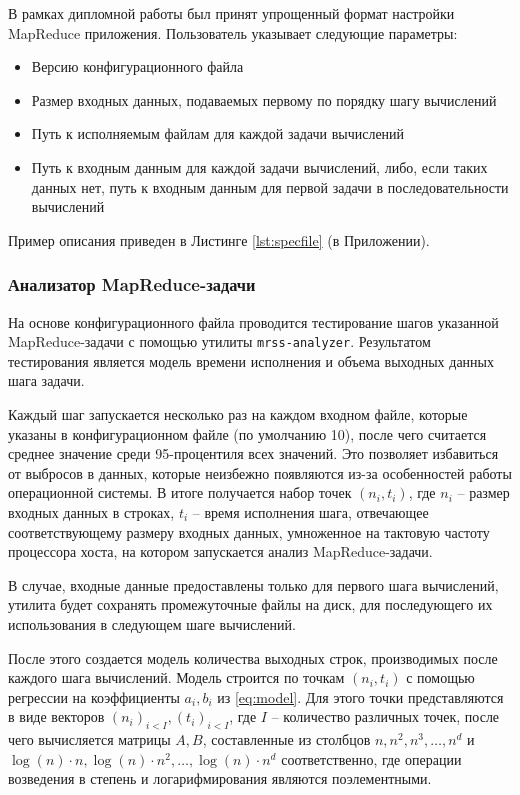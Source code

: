 \documentclass[../diploma.tex]{subfile}
\begin{document}
    В рамках дипломной работы был принят упрощенный формат настройки MapReduce
    приложения. Пользователь указывает следующие параметры:
    
    \begin{itemize}
        \item Версию конфигурационного файла
        \item Размер входных данных, подаваемых первому по порядку шагу вычислений
        \item Путь к исполняемым файлам для каждой задачи вычислений
        \item Путь к входным данным для каждой задачи вычислений, либо, если
              таких данных нет, путь к входным данным для первой задачи в
              последовательности вычислений
    \end{itemize}

    Пример описания приведен в Листинге \ref{lst:specfile} (в Приложении). 
    
    \subsubsection{Анализатор MapReduce-задачи}

    На основе конфигурационного файла проводится тестирование шагов указанной 
    MapReduce\hyp{}задачи с помощью утилиты {\tt mrss-analyzer}. Результатом тестирования является модель времени
    исполнения и объема выходных данных шага задачи.

    Каждый шаг запускается несколько раз на каждом входном файле, которые
    указаны в конфигурационном файле (по умолчанию 10), после чего считается
    среднее значение среди 95-процентиля всех значений. Это позволяет избавиться
    от выбросов в данных, которые неизбежно появляются из-за особенностей работы
    операционной системы. В итоге получается набор точек $(n_i, t_i)$, где $n_i$
    -- размер входных данных в строках, $t_i$ -- время исполнения шага,
    отвечающее соответствующему размеру входных данных, умноженное на тактовую 
    частоту процессора хоста, на котором запускается анализ MapReduce-задачи.

    В случае, входные данные предоставлены только для первого шага вычислений,
    утилита будет сохранять промежуточные файлы на диск, для последующего их
    использования в следующем шаге вычислений.
    
    После этого создается модель количества выходных строк, производимых после
    каждого шага вычислений. Модель строится по точкам $(n_i, t_i)$ с помощью
    регрессии на коэффициенты $a_i, b_i$ из \ref{eq:model}. Для этого точки
    представляются в виде векторов $(n_i)_{i < I}, (t_i)_{i < I}$, где $I$ --
    количество различных точек, после чего вычисляется матрицы $A, B$, составленные из
    столбцов $n, n^2, n^3, \ldots, n^d$ и $\log(n)\cdot n, \log(n)\cdot n^2,
    \ldots, \log(n)\cdot n^d$ соответственно, где операции возведения в степень и
    логарифмирования являются поэлементными.
\end{document}
